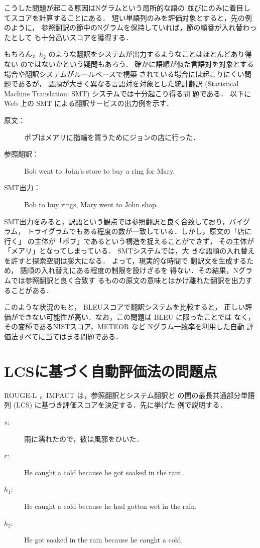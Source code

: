 \documentclass[japanese]{jnlp_1.4}
\begin{document}
こうした問題が起こる原因はNグラムという局所的な語の
並びにのみに着目してスコアを計算することにある．
短い単語列のみを評価対象とすると，先の例のように，
参照翻訳の節中のNグラムを保持していれば，節の順番が入れ替わったとして
も十分高いスコアを獲得する．


もちろん，$h_2$ のような翻訳をシステムが出力するようなことはほとんどあり得ない
のではないかという疑問もあろう．
確かに語順が似た言語対を対象とする場合や翻訳システムがルールベースで構築
されている場合には起こりにくい問題であるが，
語順が大きく異なる言語対を対象とした統計翻訳 (Statistical Machine
Translation: SMT)
システムでは十分起こり得る問
題である．
以下に Web 上の SMT による翻訳サービスの出力例を示す．

\begin{description}
 \item[原文：]ボブはメアリに指輪を買うためにジョンの店に行った．
 \item[参照翻訳：]Bob went to John's store to buy a ring for Mary.
 \item[SMT出力：]Bob to buy rings, Mary went to John shop.
\end{description}

SMT出力をみると，訳語という観点では参照翻訳と良く合致しており，バイグラム，
トライグラムでもある程度の数が一致している．しかし，原文の「店に行く」
の主体が「ボブ」であるという構造を捉えることができず，
その主体が「メアリ」となってしまっている．
SMTシステムでは，大
きな語順の入れ替えを許すと探索空間は膨大になる．
よって，現実的な時間で
翻訳文を生成するため，
語順の入れ替えにある程度の制限を設けざるを
得ない．その結果，Nグラムでは参照翻訳と良く合致す
るものの原文の意味とはかけ離れた翻訳を出力することがある．

このような状況のもと，
BLEUスコアで翻訳システムを比較すると，
正しい評価ができない可能性が高い．なお，この問題は BLEU に限ったことでは
なく，その変種であるNISTスコア，METEOR など Nグラム一致率を利用した自動
評価法すべてに当てはまる問題である．


\section{LCSに基づく自動評価法の問題点}

ROUGE-L \cite{ROUGEL}，IMPACT \cite{impact}は，参照翻訳とシステム翻訳と
の間の最長共通部分単語列 (LCS) に基づき評価スコアを決定する．先に挙げた
例で説明する．

\begin{description}
 \item[{\mdseries $s$:}] 雨に濡れたので，彼は風邪をひいた．
 \item[{\mdseries $r$:}] He caught a cold because he got soaked in the rain.
 \item[{\mdseries $h_1$:}] He caught a cold because he had gotten wet in the rain.
 \item[{\mdseries $h_2$:}] He got soaked in the rain because he caught a cold.
\end{description}
\end{document}
